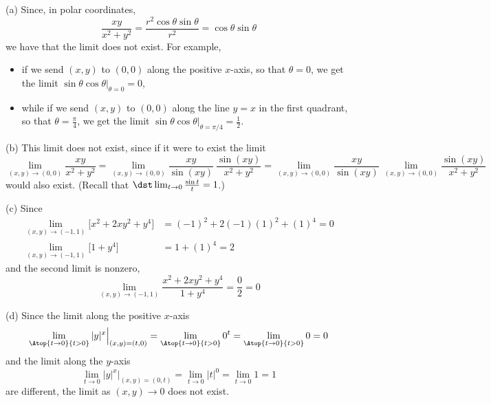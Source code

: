 \begin{solution}
(a) Since, in polar coordinates,
\begin{equation*}
\frac{xy}{x^2+y^2}=\frac{r^2\cos\theta\sin\theta}{r^2}
=\cos\theta\sin\theta
\end{equation*}
we have that the limit does not exist. For example, 
\begin{itemize}
\item if we send $(x,y)$
to $(0,0)$ along the positive $x$-axis, so that $\theta=0$, 
we get the limit $\sin\theta\cos\theta\big|_{\theta=0}=0$, 
\item
while if we send $(x,y)$ to $(0,0)$ along the line $y=x$ in the first quadrant, 
so that  $\theta=\frac{\pi}{4}$, we get the limit $\sin\theta\cos\theta\big|_{\theta=\pi/4}=\frac{1}{2}$.
\end{itemize}

(b) This limit does not exist, since if it were to exist the limit
\begin{equation*}
\lim_{(x,y)\rightarrow(0,0)}\frac{xy}{x^2+y^2}
=\lim_{(x,y)\rightarrow(0,0)}\frac{xy}{\sin(xy)}\ \frac{\sin(xy)}{x^2+y^2}
=\lim_{(x,y)\rightarrow(0,0)}\frac{xy}{\sin(xy)}\ 
\lim_{(x,y)\rightarrow(0,0)}\frac{\sin(xy)}{x^2+y^2}
\end{equation*}
would also exist. (Recall that $\dst\lim_{t\rightarrow 0}\tfrac{\sin t}{t}
=1$.)


(c) Since
\begin{align*}
\lim_{(x,y)\rightarrow(-1,1)}\big[x^2+2xy^2+y^4\big]
&=(-1)^2+2(-1)(1)^2+(1)^4=0 \\
\lim_{(x,y)\rightarrow(-1,1)}\big[1+y^4\big]
&=1+(1)^4=2
\end{align*}
and the second limit is nonzero,
\begin{equation*}
\lim_{(x,y)\rightarrow(-1,1)}\frac{x^2+2xy^2+y^4}{1+y^4}=\frac{0}{2}=0
\end{equation*}




(d)  Since the limit along the positive $x$-axis
\begin{equation*}
\lim_{\Atop{t\rightarrow 0}{t>0}}|y|^x\Big|_{(x,y)=(t,0)}
=\lim_{\Atop{t\rightarrow 0}{t>0}}0^t
=\lim_{\Atop{t\rightarrow 0}{t>0}}0
=0
\end{equation*}
and the limit along the $y$-axis
\begin{equation*}
\lim_{t\rightarrow 0}|y|^x\Big|_{(x,y)=(0,t)}
=\lim_{t\rightarrow 0}|t|^0
=\lim_{t\rightarrow 0}1
=1
\end{equation*}
are different, the limit as $(x,y)\rightarrow 0$ does not exist.
\end{solution}
